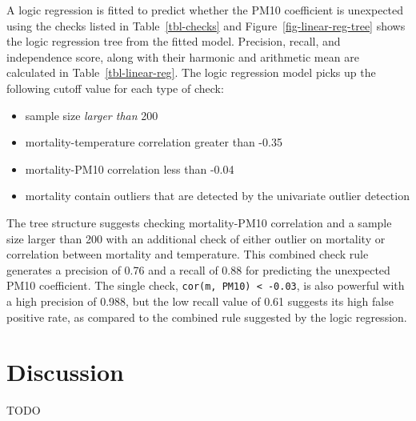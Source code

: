 \documentclass[
  12pt,
]{interact}
\providecommand{\tightlist}{%
  \setlength{\itemsep}{0pt}\setlength{\parskip}{0pt}}\usepackage{longtable,booktabs,array}
\begin{document}
A logic regression is fitted to predict whether the PM10 coefficient is
unexpected using the checks listed in Table~\ref{tbl-checks} and
Figure~\ref{fig-linear-reg-tree} shows the logic regression tree from
the fitted model. Precision, recall, and independence score, along with
their harmonic and arithmetic mean are calculated in
Table~\ref{tbl-linear-reg}. The logic regression model picks up the
following cutoff value for each type of check:

\begin{itemize}
\tightlist
\item
  sample size \emph{larger than} 200
\item
  mortality-temperature correlation greater than -0.35
\item
  mortality-PM10 correlation less than -0.04
\item
  mortality contain outliers that are detected by the univariate outlier
  detection
\end{itemize}

The tree structure suggests checking mortality-PM10 correlation and a
sample size larger than 200 with an additional check of either outlier
on mortality or correlation between mortality and temperature. This
combined check rule generates a precision of 0.76 and a recall of 0.88
for predicting the unexpected PM10 coefficient. The single check,
\texttt{cor(m,\ PM10)\ \textless{}\ -0.03}, is also powerful with a high
precision of 0.988, but the low recall value of 0.61 suggests its high
false positive rate, as compared to the combined rule suggested by the
logic regression.

\section{Discussion}\label{sec-discussion}

TODO
\end{document}
